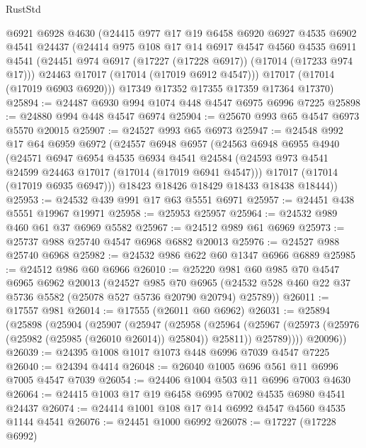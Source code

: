 \begin{lexlean}{RustStd}
\begin{coremodule}
{\begin{coremodule}
{{{{{{{{{{{{{{{{{{{{{{{{{{{{{{{{{{{{{{{{{{{{{{{{{{{{{{{      @6921
      @6928
      @4630
      (@24415
        @977
        @17
        @19
        @6458
        @6920
        @6927
        @4535
        @6902
        @4541
        @24437
        (@24414
          @975
          @108
          @17
          @14
          @6917
          @4547
          @4560
          @4535
          @6911
          @4541
          (@24451 @974 @6917 (@17227 (@17228 @6917)) (@17014 (@17233 @974 @17)))
          @24463
          @17017
          (@17014 (@17019 @6912 @4547)))
        @17017
        (@17014 (@17019 @6903 @6920)))
      @17349
      @17352
      @17355
      @17359
      @17364
      @17370)
@25894 := @24487 @6930 @994 @1074 @448 @4547 @6975 @6996 @7225
@25898 := @24880 @994 @448 @4547 @6974
@25904 := @25670 @993 @65 @4547 @6973 @5570 @20015
@25907 := @24527 @993 @65 @6973
@25947 := @24548
    @992
    @17
    @64
    @6959
    @6972
    (@24557
      @6948
      @6957
      (@24563
        @6948
        @6955
        @4940
        (@24571
          @6947
          @6954
          @4535
          @6934
          @4541
          @24584
          (@24593 @973 @4541 @24599 @24463 @17017 (@17014 (@17019 @6941 @4547)))
          @17017
          (@17014 (@17019 @6935 @6947)))
        @18423
        @18426
        @18429
        @18433
        @18438
        @18444))
@25953 := @24532 @439 @991 @17 @63 @5551 @6971
@25957 := @24451 @438 @5551 @19967 @19971
@25958 := @25953 @25957
@25964 := @24532 @989 @460 @61 @37 @6969 @5582
@25967 := @24512 @989 @61 @6969
@25973 := @25737 @988 @25740 @4547 @6968 @6882 @20013
@25976 := @24527 @988 @25740 @6968
@25982 := @24532 @986 @622 @60 @1347 @6966 @6889
@25985 := @24512 @986 @60 @6966
@26010 := @25220
    @981
    @60
    @985
    @70
    @4547
    @6965
    @6962
    @20013
    (@24527
      @985
      @70
      @6965
      (@24532 @528 @460 @22 @37 @5736 @5582 (@25078 @527 @5736 @20790 @20794) @25789))
@26011 := @17557 @981
@26014 := @17555 (@26011 @60 @6962)
@26031 := @25894
    (@25898
      (@25904
        (@25907
          (@25947
            (@25958
              (@25964
                (@25967 (@25973 (@25976 (@25982 (@25985 (@26010 @26014)) @25804)) @25811))
                @25789))))
        @20096))
@26039 := @24395 @1008 @1017 @1073 @448 @6996 @7039 @4547 @7225
@26040 := @24394 @4414
@26048 := @26040 @1005 @696 @561 @11 @6996 @7005 @4547 @7039
@26054 := @24406 @1004 @503 @11 @6996 @7003 @4630
@26064 := @24415 @1003 @17 @19 @6458 @6995 @7002 @4535 @6980 @4541 @24437
@26074 := @24414 @1001 @108 @17 @14 @6992 @4547 @4560 @4535 @1144 @4541
@26076 := @24451 @1000 @6992
@26078 := @17227 (@17228 @6992)
}}}}}}}}}}}}}}}}}}}}}}}}}}}}}}}}}}}}}}}}}}}}}}}}}}}}}}}
\end{coremodule}}
\end{coremodule}
\end{lexlean}
